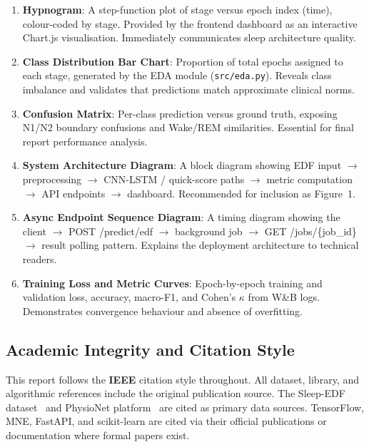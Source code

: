 \documentclass[10pt]{article}
\begin{document}
\begin{enumerate}
  \item \textbf{Hypnogram}: A step-function plot of stage versus epoch index (time), colour-coded by stage. Provided by the frontend dashboard as an interactive Chart.js visualisation. Immediately communicates sleep architecture quality.
  \item \textbf{Class Distribution Bar Chart}: Proportion of total epochs assigned to each stage, generated by the EDA module (\texttt{src/eda.py}). Reveals class imbalance and validates that predictions match approximate clinical norms.
  \item \textbf{Confusion Matrix}: Per-class prediction versus ground truth, exposing N1/N2 boundary confusions and Wake/REM similarities. Essential for final report performance analysis.
  \item \textbf{System Architecture Diagram}: A block diagram showing EDF input $\rightarrow$ preprocessing $\rightarrow$ CNN-LSTM / quick-score paths $\rightarrow$ metric computation $\rightarrow$ API endpoints $\rightarrow$ dashboard. Recommended for inclusion as Figure~1.
  \item \textbf{Async Endpoint Sequence Diagram}: A timing diagram showing the client $\rightarrow$ POST /predict/edf $\rightarrow$ background job $\rightarrow$ GET /jobs/\{job\_id\} $\rightarrow$ result polling pattern. Explains the deployment architecture to technical readers.
  \item \textbf{Training Loss and Metric Curves}: Epoch-by-epoch training and validation loss, accuracy, macro-F1, and Cohen's $\kappa$ from W\&B logs. Demonstrates convergence behaviour and absence of overfitting.
\end{enumerate}

\subsection{Academic Integrity and Citation Style}
\label{sec:citation}

This report follows the \textbf{IEEE} citation style throughout. All dataset, library, and algorithmic references include the original publication source. The Sleep-EDF dataset~\cite{kemp2000analysis} and PhysioNet platform~\cite{goldberger2000physiobank} are cited as primary data sources. TensorFlow, MNE, FastAPI, and scikit-learn are cited via their official publications or documentation where formal papers exist.
\end{document}

